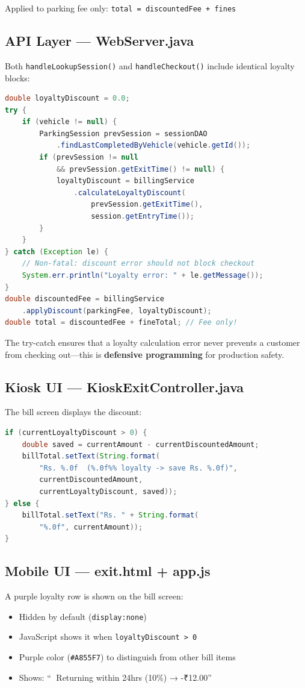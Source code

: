 \documentclass[12pt,a4paper]{article}
\begin{document}
Applied to parking fee only: \texttt{total = discountedFee + fines}

\subsection{API Layer — WebServer.java}
Both \texttt{handleLookupSession()} and \texttt{handleCheckout()} include identical loyalty blocks:

\begin{lstlisting}[language=Java, caption={Loyalty Integration in API}]
double loyaltyDiscount = 0.0;
try {
    if (vehicle != null) {
        ParkingSession prevSession = sessionDAO
            .findLastCompletedByVehicle(vehicle.getId());
        if (prevSession != null 
            && prevSession.getExitTime() != null) {
            loyaltyDiscount = billingService
                .calculateLoyaltyDiscount(
                    prevSession.getExitTime(), 
                    session.getEntryTime());
        }
    }
} catch (Exception le) {
    // Non-fatal: discount error should not block checkout
    System.err.println("Loyalty error: " + le.getMessage());
}
double discountedFee = billingService
    .applyDiscount(parkingFee, loyaltyDiscount);
double total = discountedFee + fineTotal; // Fee only!
\end{lstlisting}

The try-catch ensures that a loyalty calculation error never prevents a customer from checking out---this is \textbf{defensive programming} for production safety.

\subsection{Kiosk UI — KioskExitController.java}
The bill screen displays the discount:

\begin{lstlisting}[language=Java, caption={Kiosk Bill Display with Discount}]
if (currentLoyaltyDiscount > 0) {
    double saved = currentAmount - currentDiscountedAmount;
    billTotal.setText(String.format(
        "Rs. %.0f  (%.0f%% loyalty -> save Rs. %.0f)",
        currentDiscountedAmount, 
        currentLoyaltyDiscount, saved));
} else {
    billTotal.setText("Rs. " + String.format(
        "%.0f", currentAmount));
}
\end{lstlisting}

\subsection{Mobile UI — exit.html + app.js}
A purple loyalty row is shown on the bill screen:
\begin{itemize}[noitemsep]
    \item Hidden by default (\texttt{display:none})
    \item JavaScript shows it when \texttt{loyaltyDiscount > 0}
    \item Purple color (\texttt{\#A855F7}) to distinguish from other bill items
    \item Shows: ``🎫 Returning within 24hrs (10\%) → -₹12.00''
\end{itemize}
\end{document}
